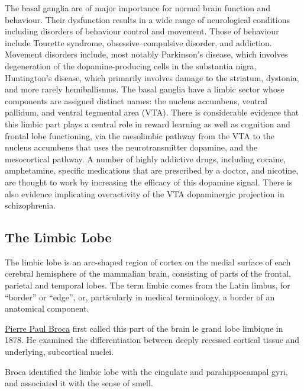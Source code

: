 The basal ganglia are of major importance for normal brain function and behaviour. Their dysfunction results in a wide range of neurological conditions including disorders of behaviour control and movement. Those of behaviour include Tourette syndrome, obsessive--compulsive disorder, and addiction. Movement disorders include, most notably Parkinson's disease, which involves degeneration of the dopamine-producing cells in the substantia nigra, Huntington's disease, which primarily involves damage to the striatum, dystonia, and more rarely hemiballismus. The basal ganglia have a limbic sector whose components are assigned distinct names: the nucleus accumbens, ventral pallidum, and ventral tegmental area (VTA). There is considerable evidence that this limbic part plays a central role in reward learning as well as cognition and frontal lobe functioning, via the mesolimbic pathway from the VTA to the nucleus accumbens that uses the neurotransmitter dopamine, and the mesocortical pathway. A number of highly addictive drugs, including cocaine, amphetamine, specific medications that are prescribed by a doctor, and nicotine, are thought to work by increasing the efficacy of this dopamine signal. There is also evidence implicating overactivity of the VTA dopaminergic projection in schizophrenia.

\hypertarget{the-limbic-lobe}{%
\subsection{The Limbic Lobe}\label{the-limbic-lobe}}

The limbic lobe is an arc-shaped region of cortex on the medial surface of each cerebral hemisphere of the mammalian brain, consisting of parts of the frontal, parietal and temporal lobes. The term limbic comes from the Latin limbus, for ``border'' or ``edge'', or, particularly in medical terminology, a border of an anatomical component.

\href{https://en.wikipedia.org/wiki/Paul_Broca}{Pierre Paul Broca} first called this part of the brain le grand lobe limbique in 1878. He examined the differentiation between deeply recessed cortical tissue and underlying, subcortical nuclei.

Broca identified the limbic lobe with the cingulate and parahippocampal gyri, and associated it with the sense of smell.

